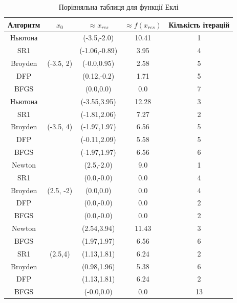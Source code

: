 \clearpage
\begin{table}[ht!]
    \centering
    \begin{tabular}{|c|c|c|c|c|}
        \hline
        \textbf{Алгоритм} & $x_{0}$ & $\approx x_{res}$ & $\approx f(x_{res})$ & \textbf{Кількість ітерацій}  \\
        \hline
        Ньютона & \multirow{5}{*}{(-3.5, 2)} & (-3.5,-2.0) & 10.41 & 1 \\
        \cline{1-1} \cline{3-5}
        SR1 & & (-1.06,-0.89) & 3.95 & 4 \\
        \cline{1-1} \cline{3-5}
        Broyden & & (-0.0,0.95) & 2.58 & 5 \\
        \cline{1-1} \cline{3-5}
        DFP & & (0.12,-0.2) & 1.71 & 5 \\
        \cline{1-1} \cline{3-5}
        BFGS & & (0.0,0.0) & 0.0 & 7 \\
        \hline
        Ньютона & \multirow{5}{*}{(-3.5, 4)} & (-3.55,3.95) & 12.28 & 3 \\
        \cline{1-1} \cline{3-5}
        SR1 & & (-1.81,2.06) & 7.27 & 2 \\
        \cline{1-1} \cline{3-5}
        Broyden & & (-1.97,1.97) & 6.56 & 5 \\
        \cline{1-1} \cline{3-5}
        DFP & & (-0.11,2.09) & 5.58 & 5 \\
        \cline{1-1} \cline{3-5}
        BFGS & & (-1.97,1.97) & 6.56 & 6 \\
        \hline
        Newton & \multirow{5}{*}{(2.5, -2)} & (2.5,-2.0) & 9.0 & 1 \\
        \cline{1-1} \cline{3-5}
        SR1 & & (0.0,-0.0) & 0.0 & 4 \\
        \cline{1-1} \cline{3-5}
        Broyden & & (0.0,0.0) & 0.0 & 4 \\
        \cline{1-1} \cline{3-5}
        DFP & & (0.0,-0.0) & 0.0 & 2 \\
        \cline{1-1} \cline{3-5}
        BFGS & & (0.0,-0.0) & 0.0 & 2 \\
        \hline
        Newton & \multirow{5}{*}{(2.5,4)} & (2.54,3.94) & 11.43 & 3 \\
        \cline{1-1} \cline{3-5}
        BFGS & & (1.97,1.97) & 6.56 & 6 \\
        \cline{1-1} \cline{3-5}
        SR1 & & (1.13,1.81) & 6.24 & 2 \\
        \cline{1-1} \cline{3-5}
        Broyden & & (0.98,1.96) & 5.38 & 6 \\
        \cline{1-1} \cline{3-5}
        DFP & & (1.13,1.81) & 6.24 & 2 \\
        \cline{1-1} \cline{3-5}
        BFGS & & (-0.0,0.0) & 0.0 & 13 \\
        \hline
    \end{tabular}
    \caption{Порівняльна таблиця для функції Еклі}
\end{table}
